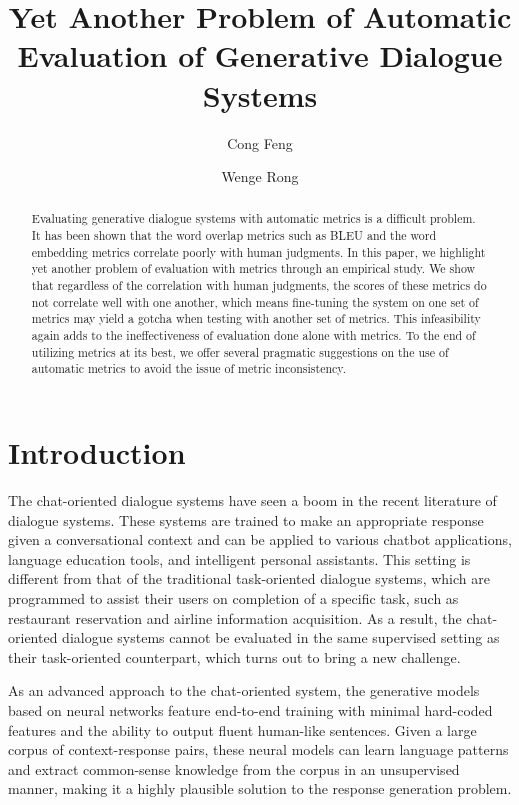\documentclass[runningheads]{llncs}
\begin{document}
    \title{Yet Another Problem of Automatic Evaluation of Generative Dialogue Systems}
    \author{Cong Feng \and Wenge Rong}

    \maketitle
    \begin{abstract}
        Evaluating generative dialogue systems with automatic metrics is a difficult problem. It has been shown that the word overlap metrics such as BLEU and the word embedding metrics correlate poorly with human judgments. In this paper, we highlight yet another problem of evaluation with metrics through an empirical study. We show that regardless of the correlation with human judgments, the scores of these metrics do not correlate well with one another, which means fine-tuning the system on one set of metrics may yield a gotcha when testing with another set of metrics. This infeasibility again adds to the ineffectiveness of evaluation done alone with metrics. To the end of utilizing metrics at its best, we offer several pragmatic suggestions on the use of automatic metrics to avoid the issue of metric inconsistency.
    \end{abstract}
    \section{Introduction}
    The chat-oriented dialogue systems have seen a boom in the recent literature of dialogue systems. These systems are trained to make an appropriate response given a conversational context and can be applied to various chatbot applications, language education tools, and intelligent personal assistants. This setting is different from that of the traditional task-oriented dialogue systems, which are programmed to assist their users on completion of a specific task, such as restaurant reservation and airline information acquisition. As a result, the chat-oriented dialogue systems cannot be evaluated in the same supervised setting as their task-oriented counterpart, which turns out to bring a new challenge.

    As an advanced approach to the chat-oriented system, the generative models based on neural networks feature end-to-end training with minimal hard-coded features and the ability to output fluent human-like sentences. Given a large corpus of context-response pairs, these neural models can learn language patterns and extract common-sense knowledge from the corpus in an unsupervised manner, making it a highly plausible solution to the response generation problem.
\end{document}
